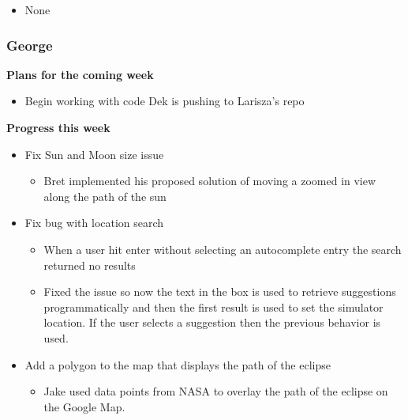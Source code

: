 \documentclass[10pt, onecolumn, draftclsnofoot, letterpaper, compsoc]{IEEEtran}
\begin{document}
    \begin{itemize}

    \item None

    \end{itemize}

    \subsubsection{George}

    \noindent \textbf{Plans for the coming week}

    \begin{itemize}

    \item Begin working with code Dek is pushing to Larisza's repo

    \end{itemize}

    \noindent \textbf{Progress this week}

    \begin{itemize}

    \item Fix Sun and Moon size issue
    \begin{itemize}
      \item Bret implemented his proposed solution of moving a zoomed in view along the path of the sun
    \end{itemize}

    \item Fix bug with location search
    \begin{itemize}
      \item When a user hit enter without selecting an autocomplete entry the search returned no results
      \item Fixed the issue so now the text in the box is used to retrieve suggestions programmatically and then the first result is used to set the simulator location. If the user selects a suggestion then the previous behavior is used.
    \end{itemize}

    \item Add a polygon to the map that displays the path of the eclipse
    \begin{itemize}
      \item Jake used data points from NASA to overlay the path of the eclipse on the Google Map.
    \end{itemize}

    \end{itemize}
\end{document}
